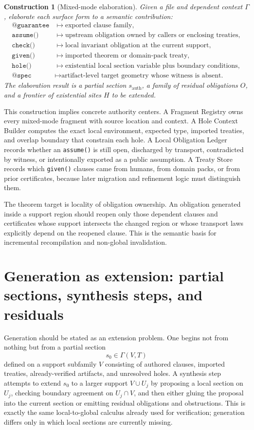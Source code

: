 \documentclass[11pt]{report}
\newtheorem{construction}[definition]{Construction}
\newcommand{\Sec}{\Gamma}
\begin{document}
\begin{construction}[Mixed-mode elaboration]
Given a file and dependent context $\Gamma$, elaborate each surface form to a semantic contribution:
\[
\begin{aligned}
\texttt{@guarantee} &\mapsto \text{exported clause family},\\
\texttt{assume()} &\mapsto \text{upstream obligation owned by callers or enclosing treaties},\\
\texttt{check()} &\mapsto \text{local invariant obligation at the current support},\\
\texttt{given()} &\mapsto \text{imported theorem or domain-pack treaty},\\
\texttt{hole()} &\mapsto \text{existential local section variable plus boundary conditions},\\
\texttt{@spec} &\mapsto \text{artifact-level target geometry whose witness is absent.}
\end{aligned}
\]
The elaboration result is a partial section $s_{\mathrm{auth}}$, a family of residual obligations $O$, and a frontier of existential sites $H$ to be extended.
\end{construction}

This construction implies concrete authority centers. A Fragment Registry owns every mixed-mode fragment with source location and context. A Hole Context Builder computes the exact local environment, expected type, imported treaties, and overlap boundary that constrain each hole. A Local Obligation Ledger records whether an \texttt{assume()} is still open, discharged by transport, contradicted by witness, or intentionally exported as a public assumption. A Treaty Store records which \texttt{given()} clauses came from humans, from domain packs, or from prior certificates, because later migration and refinement logic must distinguish them.

The theorem target is locality of obligation ownership. An obligation generated inside a support region should reopen only those dependent clauses and certificates whose support intersects the changed region or whose transport laws explicitly depend on the reopened clause. This is the semantic basis for incremental recompilation and non-global invalidation.
\section{Generation as extension: partial sections, synthesis steps, and residuals}
Generation should be stated as an extension problem. One begins not from nothing but from a partial section
\[
s_0 \in \Sec(V,T)
\]
defined on a support subfamily $V$ consisting of authored clauses, imported treaties, already-verified artifacts, and unresolved holes. A synthesis step attempts to extend $s_0$ to a larger support $V\cup U_j$ by proposing a local section on $U_j$, checking boundary agreement on $U_j\cap V$, and then either gluing the proposal into the current section or emitting residual obligations and obstructions. This is exactly the same local-to-global calculus already used for verification; generation differs only in which local sections are currently missing.
\end{document}
